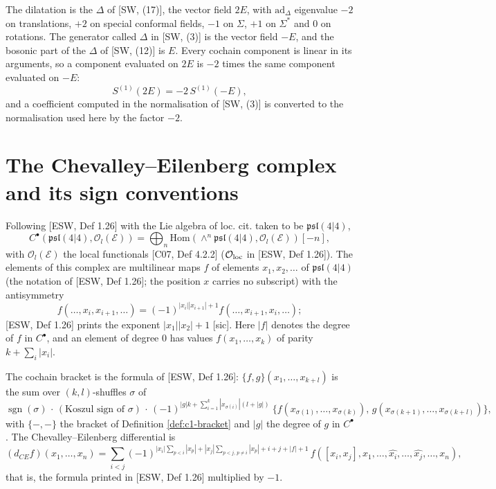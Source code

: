 \begin{remark}
\label{rem:c2-dilatation}
The dilatation is the $\Delta$ of [SW, (17)], the vector field $2E$, with $\mathrm{ad}_\Delta$ eigenvalue $-2$ on translations, $+2$ on special conformal fields, $-1$ on $\Sigma$, $+1$ on $\Sigma^*$ and $0$ on rotations. The generator called $\Delta$ in [SW, (3)] is the vector field $-E$, and the bosonic part of the $\Delta$ of [SW, (12)] is $E$. Every cochain component is linear in its arguments, so a component evaluated on $2E$ is $-2$ times the same component evaluated on $-E$:
\[
S^{(1)}(2E)=-2\,S^{(1)}(-E),
\]
and a coefficient computed in the normalisation of [SW, (3)] is converted to the normalisation used here by the factor $-2$.
\end{remark}

\section{The Chevalley--Eilenberg complex and its sign conventions}

\begin{definition}[Cochains]
\label{def:c2-cochains}
Following [ESW, Def 1.26] with the Lie algebra of loc. cit. taken to be $\mathfrak{psl}(4|4)$,
\[
C^\bullet(\mathfrak{psl}(4|4),\mathscr O_l(\mathscr E))=\bigoplus_n\mathrm{Hom}(\wedge^n\mathfrak{psl}(4|4),\mathscr O_l(\mathscr E))[-n],
\]
with $\mathscr O_l(\mathscr E)$ the local functionals [C07, Def 4.2.2] ($\mathcal O_{\rm loc}$ in [ESW, Def 1.26]). The elements of this complex are multilinear maps $f$ of elements $x_1,x_2,\dots$ of $\mathfrak{psl}(4|4)$ (the notation of [ESW, Def 1.26]; the position $x$ carries no subscript) with the antisymmetry
\[
f(\dots,x_i,x_{i+1},\dots)=(-1)^{|x_i||x_{i+1}|+1}f(\dots,x_{i+1},x_i,\dots);
\]
[ESW, Def 1.26] prints the exponent $|x_1||x_2|+1$ [sic]. Here $|f|$ denotes the degree of $f$ in $C^\bullet$, and an element of degree $0$ has values $f(x_1,\dots,x_k)$ of parity $k+\sum_i|x_i|$.
\end{definition}

\begin{definition}
\label{def:c2-dce}
The cochain bracket is the formula of [ESW, Def 1.26]: $\{f,g\}(x_1,\dots,x_{k+l})$ is the sum over $(k,l)$-shuffles $\sigma$ of
\[
\operatorname{sgn}(\sigma)\,\cdot\,(\text{Koszul sign of }\sigma)\,\cdot\,(-1)^{|g|k+\sum_{i=1}^k|x_{\sigma(i)}|(l+|g|)}\ \{f(x_{\sigma(1)},\dots,x_{\sigma(k)}),\,g(x_{\sigma(k+1)},\dots,x_{\sigma(k+l)})\},
\]
with $\{-,-\}$ the bracket of Definition \ref{def:c1-bracket} and $|g|$ the degree of $g$ in $C^\bullet$. The Chevalley--Eilenberg differential is
\begin{equation}
(d_{CE}f)(x_1,\dots,x_n)=\sum_{i<j}(-1)^{|x_i|\sum_{p<i}|x_p|+|x_j|\sum_{p<j,\,p\neq i}|x_p|+i+j+|f|+1}\,f([x_i,x_j],x_1,\dots,\widehat{x_i},\dots,\widehat{x_j},\dots,x_n),
\label{eq:c2-dce}
\end{equation}
that is, the formula printed in [ESW, Def 1.26] multiplied by $-1$.
\end{definition}

